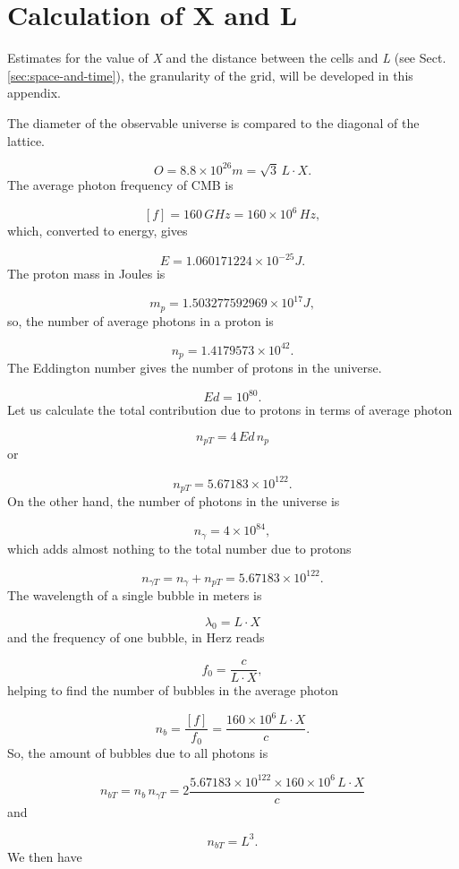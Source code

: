 \documentclass{ijuc}
\begin{document}
\section{Calculation of X and L\label{sec:Calculation-of-X}}

Estimates for the value of \emph{X} and the distance between the cells
and \emph{L} (see Sect. \ref{sec:space-and-time}), the granularity
of the grid, will be developed in this appendix.

The diameter of the observable universe \cite{halpbern} is compared
to the diagonal of the lattice.

\begin{equation}
O=8.8\times10^{26}m=\sqrt{3}\,L\cdot X.\label{eq:obs}
\end{equation}
The average photon frequency of CMB \cite{archeops} is

\[
[f]=160\,GHz=160\times10^{6}\,Hz,
\]
which, converted to energy, gives

\[
E=1.060171224\times10^{-25}J.
\]
The proton mass in Joules is

\[
m_{p}=1.503277592969\times10^{17}J,
\]
so, the number of average photons in a proton is

\[
n_{p}=1.4179573\times10^{42}.
\]
The Eddington number gives the number of protons in the universe.

\[
Ed=10^{80}.
\]
Let us calculate the total contribution due to protons in terms of
average photon

\[
n_{pT}=4\,Ed\,n_{p}
\]
or

\[
n_{pT}=5.67183\times10^{122}.
\]
On the other hand, the number of photons in the universe is

\[
n_{\gamma}=4\times10^{84},
\]
which adds almost nothing to the total number due to protons

\[
n_{\gamma T}=n_{\gamma}+n_{pT}=5.67183\times10^{122}.
\]
The wavelength of a single bubble in meters is

\[
\lambda_{0}=L\cdot X
\]
and the frequency of one bubble, in Herz reads

\[
f_{0}=\frac{c}{L\cdot X},
\]
helping to find the number of bubbles in the average photon

\[
n_{b}=\frac{[f]}{f_{0}}=\frac{160\times10^{6}\,L\cdot X}{c}.
\]
So, the amount of bubbles due to all photons is

\[
n_{bT}=n_{b}\,n_{\gamma T}=2\frac{5.67183\times10^{122}\times160\times10^{6}\,L\cdot X}{c}
\]
and

\[
n_{bT}=L^{3}.
\]
We then have
\end{document}
